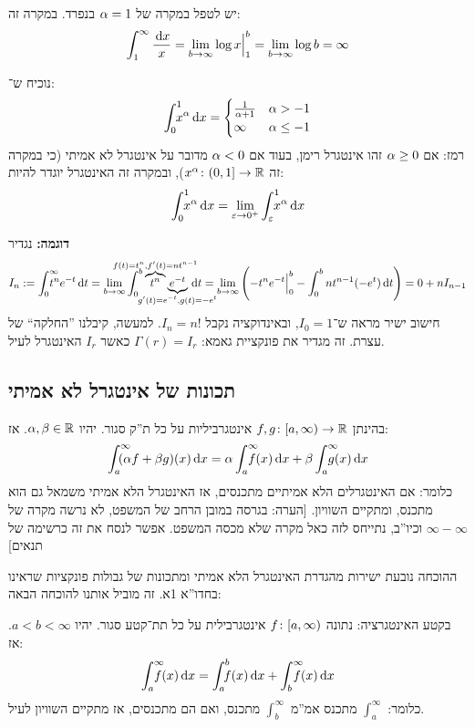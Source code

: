 \documentclass[]{../../../../tex/classes/styledArticle}
\newcommand\Is{\dequad \ }
\begin{document}
	יש לטפל במקרה של $\alpha = 1$ בנפרד. במקרה זה: 
	\[ \int^{\infty}_1 \frac{\,\mathrm{d}x}{x} = \lim_{b \to \infty} \log x \Big\vert^{b}_1 = \lim_{b \to \infty} \log b = \infty \]
	
	\exe{חשבו את האינטגרל: 
	\[ \int^{1}_0 \Is x^{\ag} \]}
	נוכיח ש־: 
	\[ \int^{1}_0\Is x^{\ag}\dx = \begin{cases}
		\frac{1}{\ag  +1} & \ag > -1 \\
		\infty & \ag \le -1
	\end{cases} \]
	רמז: אם $\alpha \ge 0$ זהו אינטגרל רימן, בעוד אם $\alpha < 0$ מדובר על אינטגרל לא אמיתי (כי במקרה זה $x^{\alpha} \colon (0, 1] \to \mathbb{R}$), ובמקרה זה האינטגרל יוגדר להיות: 
	\[ \int^{1}_0 \Is x^{\ag}\dx = \lim_{\eg \to 0^{+}} \int^{1}_{\eg} \Is x^{\ag} \dx \]
	
	\textbf{דוגמה: }נגדיר
	\[ I_n := \int^{\infty}_0 \dequad t^{n}e^{-t}\dt = \lim_{b \to \infty} \int^{b}_0  \overbrace{t^{n}}^{\mathclap{f(t) = t^{n}, f'(t) = nt^{n -1}}}\underbrace{e^{-t}}_{\mathclap{g'(t) = e^{-t}, g(t) = -e^{t}}}\dt = \lim_{b \to \infty} \cl{-t^{n}e^{-t}\Big\vert^{b}_0 - \int^{b}_0 nt^{n - 1}(-e^{t})\dt} = 0 + nI_{n - 1} \]
	חישוב ישיר מראה ש־$I_0 = 1$, ובאינדוקציה נקבל $I_n = n!$. למעשה, קיבלנו ''החלקה`` של עצרת. זה מגדיר את פונקציית גאמא: $\Gamma(r) = I_r$ כאשר $I_r$ האינטגרל לעיל. 
	
	\subsection*{תכונות של אינטגרל לא אמיתי}
	\begin{Theorem}
		בהינתן $f, g \colon [a, \infty) \to \mathbb{R}$ אינטגרביליות על כל ת''ק סגור. יהיו $\alpha, \beta \in \mathbb{R}$. אז: 
		\[ \int^{\infty}_a \dequad (\ag f + \bg g)(x)\dx = \ag\int^{\infty}_a \dequad f(x)\dx + \bg\int^{\infty}_a \dequad g(x)\dx \]
		כלומר: אם האינטגרלים הלא אמיתיים מתכנסים, אז האינטגרל הלא אמיתי משמאל גם הוא מתכנס, ומתקיים השוויון. [הערה: בגרסה במובן הרחב של המשפט, לא נרשה מקרה של $\infty - \infty$ וכיו''ב, נתייחס לזה כאל מקרה שלא מכסה המשפט. אפשר לנסח את זה כרשימה של תנאים]
	\end{Theorem}
	ההוכחה נובעת ישירות מהגדרת האינטגרל הלא אמיתי ומתכונות של גבולות פונקציות שראינו בחדו''א 1א. זה מוביל אותנו להוכחה הבאה: 
	\prooftrivial
	
	\begin{Theorem}[אדטיביות]
		בקטע האינטגרציה: נתונה $f \colon [a, \infty)$ אינטגרבילית על כל תת־קטע סגור. יהיו $a < b < \infty$. אז: 
		\[ \int^{\infty}_a \dequad f(x) \dx = \int^{b}_a \Is f(x) \dx +\int^{\infty}_b\dequad f(x) \dx \]
		כלומר: $\int^{\infty}_a$ מתכנס אמ''מ $\int^{\infty}_b$ מתכנס, ואם הם מתכנסים, אז מתקיים השוויון לעיל. 
	\end{Theorem}
	\prooftrivial
	
\end{document}
